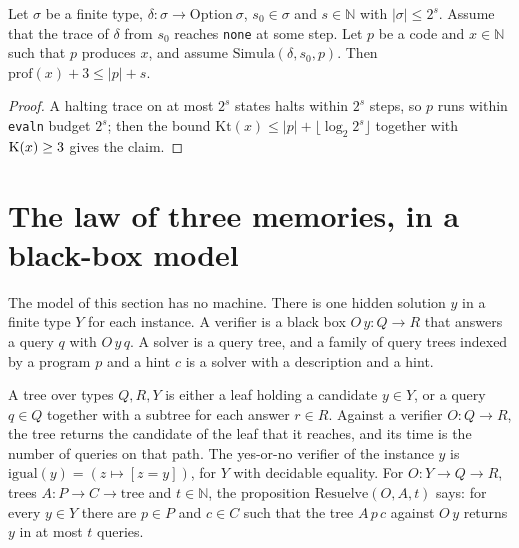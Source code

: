 \begin{theorem}
  \label{thm:information-memory-depth}
  \leanok
  Let $\sigma$ be a finite type, $\delta : \sigma \to \mathrm{Option}\ \sigma$, $s_0 \in \sigma$ and
  $s \in \mathbb{N}$ with $|\sigma| \le 2^s$. Assume that the trace of $\delta$ from $s_0$ reaches
  \texttt{none} at some step. Let $p$ be a code and $x \in \mathbb{N}$ such that $p$ produces $x$,
  and assume $\mathrm{Simula}(\delta, s_0, p)$. Then $\mathrm{prof}(x) + 3 \le |p| + s$.
\end{theorem}

\begin{proof}
  \leanok
  A halting trace on at most $2^s$ states halts within $2^s$ steps, so $p$ runs within
  \texttt{evaln} budget $2^s$; then the bound $\mathrm{Kt}(x) \le |p| + \lfloor \log_2 2^s \rfloor$
  together with $\mathrm{K}(x) \ge 3$ gives the claim.
\end{proof}

\section{The law of three memories, in a black-box model}
\label{sec:information-three-memories}

The model of this section has no machine. There is one hidden solution $y$ in a finite type $Y$ for
each instance. A verifier is a black box $O\,y : Q \to R$ that answers a query $q$ with $O\,y\,q$. A
solver is a query tree, and a family of query trees indexed by a program $p$ and a hint $c$ is a
solver with a description and a hint.

\begin{definition}
  \label{def:information-query-tree}
  \leanok
  A tree over types $Q, R, Y$ is either a leaf holding a candidate $y \in Y$, or a query $q \in Q$
  together with a subtree for each answer $r \in R$. Against a verifier $O : Q \to R$, the tree
  returns the candidate of the leaf that it reaches, and its time is the number of queries on that
  path. The yes-or-no verifier of the instance $y$ is $\mathrm{igual}(y) = (z \mapsto [z = y])$,
  for $Y$ with decidable equality. For $O : Y \to Q \to R$, trees $A : P \to C \to \text{tree}$ and
  $t \in \mathbb{N}$, the proposition $\mathrm{Resuelve}(O, A, t)$ says: for every $y \in Y$ there
  are $p \in P$ and $c \in C$ such that the tree $A\,p\,c$ against $O\,y$ returns $y$ in at most $t$
  queries.
  \own{}
\end{definition}

